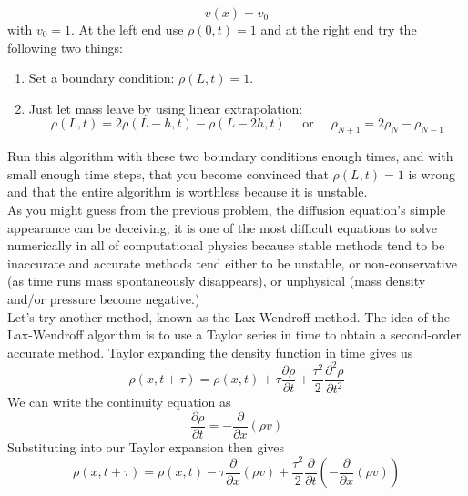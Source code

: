 \documentclass{book}
\theoremstyle{plain}
\theoremstyle{definition}
\numberwithin{exm}{chapter}
\theoremstyle{remark}
\theoremstyle{summary}
\theoremstyle{overview}
\begin{document}
\begin{equation}\label{eq:104}
v(x)=v_0
\end{equation}
with $v_{0}=1$. At the left end use $\rho(0, t)=1$ and at the right end try the following two things:
\begin{enumerate}[label=(\roman*)]
\item Set a boundary condition: $\rho(L, t)=1$.
\item Just let mass leave by using linear extrapolation:
	\begin{equation}\label{eq:105}
\rho(L, t)=2 \rho(L-h, t)-\rho(L-2 h, t) \quad \text { or } \quad \rho_{N+1}=2 \rho_{N}-\rho_{N-1}
\end{equation}


\end{enumerate}
Run this algorithm with these two boundary conditions enough times, and with small enough time steps, that you become convinced that $\rho(L, t)=1$ is wrong and that the entire algorithm is worthless because it is unstable.\\
As you might guess from the previous problem, the diffusion equation's simple appearance can be deceiving; it is one of the most difficult equations to solve numerically in all of computational physics because stable methods tend to be inaccurate and accurate methods tend either to be unstable, or non-conservative (as time runs mass spontaneously disappears), or unphysical (mass density and/or pressure become negative.)\\
Let\rq s try another method, known as the Lax-Wendroff method. The idea of the Lax-Wendroff algorithm is to use a Taylor series in time to obtain a second-order accurate method. Taylor expanding the density function in time gives us
\begin{equation}\label{eq:106}
\rho(x, t+\tau)=\rho(x, t)+\tau \frac{\partial \rho}{\partial t}+\frac{\tau^{2}}{2} \frac{\partial^{2} \rho}{\partial t^{2}}
\end{equation}
We can write the continuity equation as
\begin{equation}\label{eq:107}
\frac{\partial \rho}{\partial t}=-\frac{\partial}{\partial x}(\rho v)
\end{equation}
Substituting into our Taylor expansion then gives
\begin{equation}\label{eq:108}
\rho(x, t+\tau)=\rho(x, t)-\tau \frac{\partial}{\partial x}(\rho v)+\frac{\tau^{2}}{2} \frac{\partial}{\partial t}\left(-\frac{\partial}{\partial x}(\rho v)\right)
\end{equation}
\end{document}
